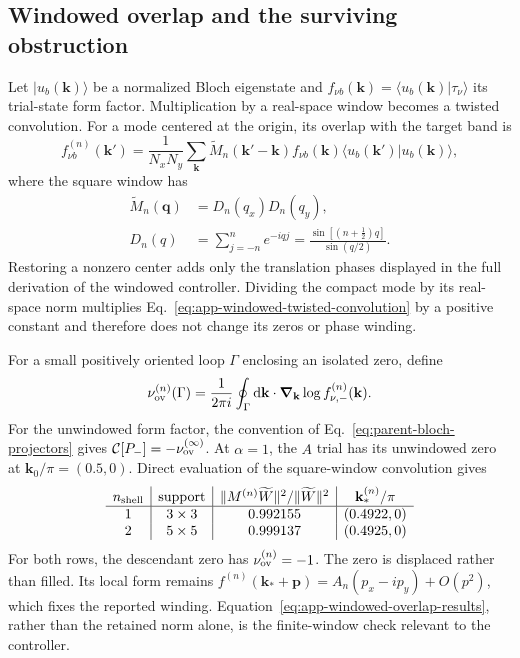 \subsection{Windowed overlap and the surviving obstruction}

Let \(\lvert u_b(\mathbf k)\rangle\) be a normalized Bloch eigenstate and
\(f_{\nu b}(\mathbf k)=\langle u_b(\mathbf k)\vert\tau_\nu\rangle\) its
trial-state form factor.  Multiplication by a real-space window becomes a
twisted convolution.  For a mode centered at the origin, its overlap with
the target band is
\begin{equation}
    f^{(n)}_{\nu b}(\mathbf k')
    =\frac{1}{N_xN_y}\sum_{\mathbf k}
      \widetilde M_n(\mathbf k'-\mathbf k)
      f_{\nu b}(\mathbf k)
      \langle u_b(\mathbf k')\vert u_b(\mathbf k)\rangle,
    \label{eq:app-windowed-twisted-convolution}
\end{equation}
where the square window has
\begin{align}
    \widetilde M_n(\mathbf q)&=D_n(q_x)D_n(q_y),
    \nonumber\\
    D_n(q)&=\sum_{j=-n}^{n}e^{-iqj}
    =\frac{\sin[(n+\tfrac12)q]}{\sin(q/2)}.
    \label{eq:app-square-dirichlet-kernel}
\end{align}
Restoring a nonzero center adds only the translation phases displayed in the
full derivation of the windowed controller.  Dividing the compact mode by its
real-space norm multiplies Eq.~\eqref{eq:app-windowed-twisted-convolution}
by a positive constant and therefore does not change its zeros or phase
winding.

For a small positively oriented loop \(\Gamma\) enclosing an isolated zero,
define
\begin{equation}
    \nu_{\rm ov}^{(n)}(\Gamma)
    =\frac{1}{2\pi i}\oint_\Gamma
      \mathrm{d}\mathbf k\cdot\boldsymbol\nabla_{\mathbf k}
      \log f^{(n)}_{\nu,-}(\mathbf k).
    \label{eq:app-overlap-winding}
\end{equation}
For the unwindowed form factor, the convention of
Eq.~\eqref{eq:parent-bloch-projectors} gives
\(\mathcal C[P_-]=-\nu_{\rm ov}^{(\infty)}\).  At
\(\alpha=1\), the $A$ trial has its unwindowed zero at
\(\mathbf k_0/\pi=(0.5,0)\).  Direct evaluation of the square-window
convolution gives
\begin{equation}
    \begin{array}{c|c|c|c}
      n_{\rm shell}&\text{support}&
      \|M^{(n)}\widetilde W\|^2/\|\widetilde W\|^2&
      \mathbf k_*^{(n)}/\pi\\ \hline
      1&3\times3&0.992155&(0.4922,0)\\
      2&5\times5&0.999137&(0.4925,0)
    \end{array}
    \label{eq:app-windowed-overlap-results}
\end{equation}
For both rows, the descendant zero has \(\nu_{\rm ov}^{(n)}=-1\).  The zero
is displaced rather than filled.  Its local form remains
\(f^{(n)}(\mathbf k_*+\mathbf p)=A_n(p_x-ip_y)+O(p^2)\), which fixes the
reported winding.  Equation~\eqref{eq:app-windowed-overlap-results}, rather
than the retained norm alone, is the finite-window check relevant to the
controller.

